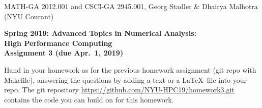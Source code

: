 \documentclass[12pt]{article}
\begin{document}
\begin{center}
  \vspace*{-2cm}
{\small MATH-GA 2012.001 and CSCI-GA 2945.001, Georg Stadler \&
  Dhairya Malhotra (NYU Courant)}
\end{center}
\vspace*{.5cm}
\begin{center}
\large \textbf{%
Spring 2019: Advanced Topics in Numerical Analysis: \\
High Performance Computing \\
Assignment 3 (due Apr.\ 1, 2019) }
\end{center}



 Hand in your homework as for
the previous homework assignment (git repo with Makefile), answering
the questions by adding a text or a \LaTeX\ file into your repo.
The git repository \url{https://github.com/NYU-HPC19/homework3.git}
contains the code you can build on for this homework.
\\[.2ex]
\end{document}
